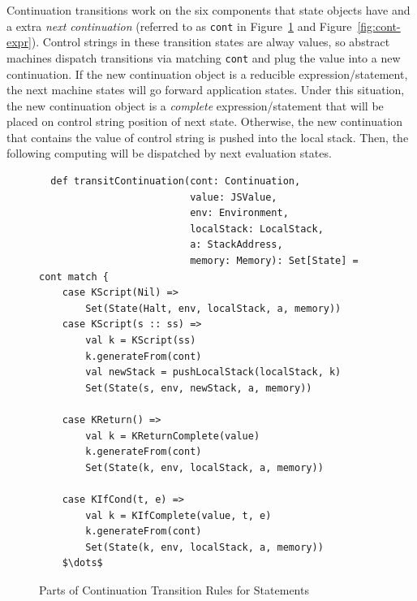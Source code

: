 \documentclass{article}
\begin{document}
Continuation transitions work on the six components that state objects have and a extra \emph{next continuation} (referred to as \verb|cont| in Figure~\ref{fig:cont-stmt} and Figure~\ref{fig:cont-expr}).
Control strings in these transition states are alway values, so abstract machines dispatch transitions via matching \verb|cont| and plug the value into a new continuation.
If the new continuation object is a reducible expression/statement, the next machine states will go forward application states. Under this situation, the new continuation object is a \emph{complete} expression/statement that will be placed on control string position of next state.
Otherwise, the new continuation that contains the value of control string is pushed into the local stack.
Then, the following computing will be dispatched by next evaluation states.

\begin{figure}
\lstset{language=Scala, mathescape}
\begin{lstlisting}
  def transitContinuation(cont: Continuation,
                          value: JSValue,
                          env: Environment,
                          localStack: LocalStack,
                          a: StackAddress,
                          memory: Memory): Set[State] = cont match {
    case KScript(Nil) =>
        Set(State(Halt, env, localStack, a, memory))
    case KScript(s :: ss) =>
        val k = KScript(ss)
        k.generateFrom(cont)
        val newStack = pushLocalStack(localStack, k)
        Set(State(s, env, newStack, a, memory))

    case KReturn() =>
        val k = KReturnComplete(value)
        k.generateFrom(cont)
        Set(State(k, env, localStack, a, memory))

    case KIfCond(t, e) =>
        val k = KIfComplete(value, t, e)
        k.generateFrom(cont)
        Set(State(k, env, localStack, a, memory))
    $\dots$
\end{lstlisting}
\caption{Parts of Continuation Transition Rules for Statements}
\label{fig:cont-stmt}
\end{figure}
\end{document}
